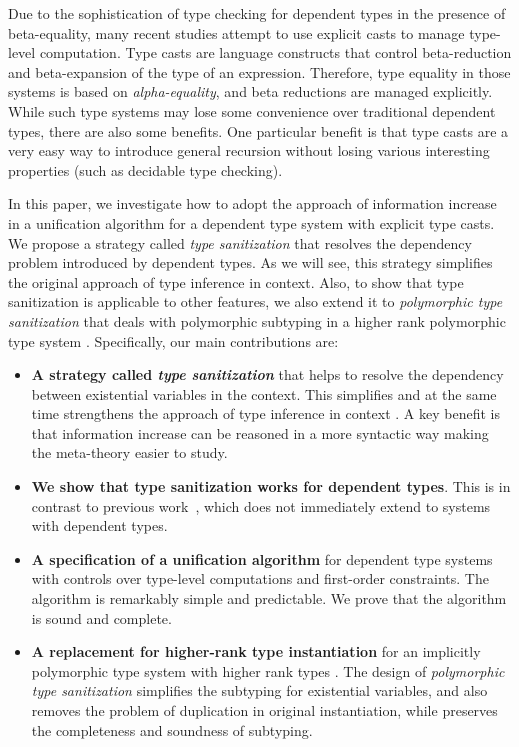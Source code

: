 Due to the sophistication of type checking for dependent types in the
presence of beta-equality, many recent
studies \citep{van2013explicit, kimmell2012equational, sjoberg2012irrelevance,
  sjoberg2015programming, stump2009verified, sulzmann2007system,
  yang2016unified} attempt to use explicit casts to manage type-level
computation. Type casts are language constructs that control beta-reduction and
beta-expansion of the type of an expression. Therefore, type equality
in those systems is based
on \emph{alpha-equality}, and beta reductions are managed
explicitly. While such type systems may lose some convenience over 
traditional dependent types, there are also some benefits. 
One particular benefit is that type casts 
are a very easy way to introduce general recursion without losing 
various interesting properties (such as decidable type checking).

In this paper, we investigate how to adopt the approach of information increase
in a unification algorithm for a dependent type system with
explicit type casts. We propose a strategy called \textit{type sanitization} that
resolves the dependency problem introduced by dependent types. As we will see,
this strategy simplifies the original approach of type inference in context.
Also, to show that type sanitization is applicable to other features, we also
extend it to \textit{polymorphic type sanitization} that deals with polymorphic
subtyping in a higher rank polymorphic type system \citep{dunfield2013complete}.
Specifically, our main contributions are:

\begin{itemize}
\item \textbf{A strategy called \textit{type sanitization}} that helps
  to resolve
  the dependency between existential variables in the context. This simplifies
  and at the same time strengthens the approach of type inference in context
  \citep{gundry2010type}. A key benefit is that information increase can be reasoned in a more
  syntactic way making the meta-theory easier to study. 
\item \textbf{We show that type sanitization works for dependent
    types}. This is in contrast to previous work~\cite{}, which does
  not immediately extend to systems with dependent types.~
\item \textbf{A specification of a unification algorithm} for dependent type
  systems with controls over type-level computations and first-order
  constraints. The algorithm is remarkably simple and predictable. We prove that
  the algorithm is sound and complete.
\item \textbf{A replacement for higher-rank type instantiation} for an
  implicitly polymorphic type system with higher rank types
  \citep{dunfield2013complete}. The design of \textit{polymorphic type
    sanitization} simplifies the subtyping for existential variables, and also
  removes the problem of duplication in original instantiation, while preserves
  the completeness and soundness of subtyping.
\end{itemize}

